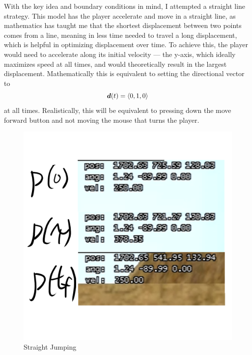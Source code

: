With the key idea and boundary conditions in mind, I attempted a straight line strategy. This model has the player accelerate and move in a straight line, as mathematics has taught me that the shortest displacement between two points comes from a line, meaning in less time needed to travel a long displacement, which is helpful in optimizing displacement over time. To achieve this, the player would need to accelerate along its initial velocity --- the y-axis, which ideally maximizes speed at all times, and would theoretically result in the largest displacement. Mathematically this is equivalent to setting the directional vector to
\[
    \boldsymbol{d}(t) = \left\langle 0, 1, 0 \right\rangle
\]
at all times. Realistically, this will be equivalent to pressing down the move forward button and not moving the mouse that turns the player.
\begin{figure}[H]
    \centering
    \begin{minipage}{.5\textwidth}
        \centering
        \includegraphics[width=0.9\linewidth]{assets/2straightjumping.png}
        \caption{Straight Jumping}
        \label{fig:2straightjumping}
    \end{minipage}%
    \begin{minipage}{.5\textwidth}
        \centering

\end{minipage}
\end{figure}
